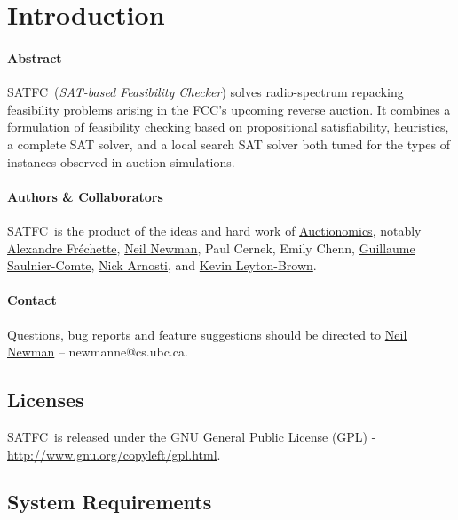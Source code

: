 \documentclass[
10pt, %
letterpaper, %
oneside, %
headinclude,footinclude, %
BCOR5mm, %
needspace, %
]{scrartcl}
\newcommand{\SATFC}{\textsc{SATFC}~}
\begin{document}
\section{Introduction}

\paragraph{Abstract} \SATFC (\emph{SAT-based Feasibility Checker}) solves radio-spectrum repacking feasibility problems arising in the FCC's upcoming reverse auction. It combines a formulation of feasibility checking based on propositional satisfiability, heuristics, a complete SAT solver, and a local search SAT solver both tuned for the types of instances observed in auction simulations.

\paragraph{Authors \& Collaborators}  \SATFC is the product of the ideas and hard work of \href{http://www.auctionomics.com/}{Auctionomics}, notably \href{http://www.cs.ubc.ca/~afrechet/}{Alexandre Fr\'echette}, \href{http://www.cs.ubc.ca/~newmanne/}{Neil Newman}, Paul Cernek, Emily Chenn, \href{http://www.cs.mcgill.ca/~gsauln/}{Guillaume Saulnier-Comte}, \href{http://web.stanford.edu/~narnosti/}{Nick Arnosti}, and \href{http://www.cs.ubc.ca/~kevinlb/}{Kevin Leyton-Brown}.

\paragraph{Contact} Questions, bug reports and feature suggestions should be directed to \href{mailto:newmanne@cs.ubc.ca}{Neil Newman} -- newmanne@cs.ubc.ca.

\subsection{Licenses}

\SATFC is released under the GNU General Public License (GPL) - \url{http://www.gnu.org/copyleft/gpl.html}.

\subsection{System Requirements}
\end{document}
